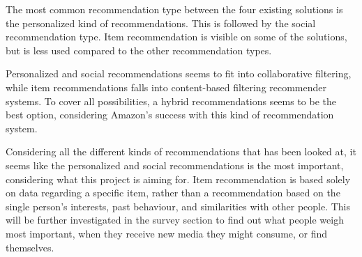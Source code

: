 The most common recommendation type between the four existing solutions is the personalized kind of recommendations. This is followed by the social recommendation type. Item recommendation is visible on some of the solutions, but is less used compared to the other recommendation types.

Personalized and social recommendations seems to fit into collaborative filtering, while item recommendations falls into content-based filtering recommender systems. To cover all possibilities, a hybrid recommendations seems to be the best option, considering Amazon’s success with this kind of recommendation system.

Considering all the different kinds of recommendations that has been looked at, it seems like the personalized and social recommendations is the most important, considering what this project is aiming for. Item recommendation is based solely on data regarding a specific item, rather than a recommendation based on the single person's interests, past behaviour, and similarities with other people. This will be further investigated in the survey section to find out what people weigh most important, when they receive new media they might consume, or find themselves.